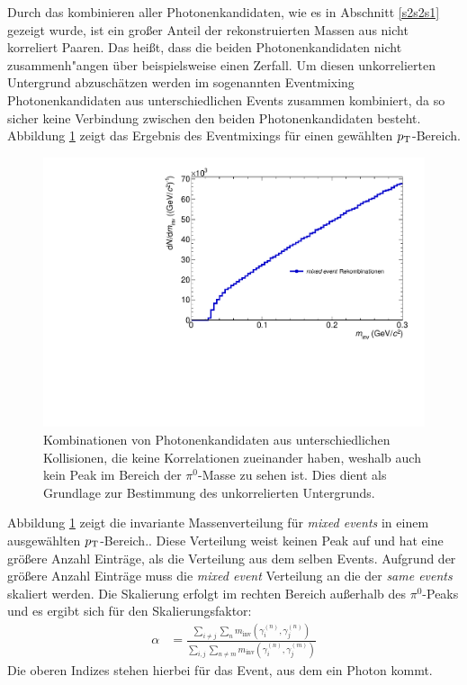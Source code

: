 Durch das kombinieren aller Photonenkandidaten, wie es in Abschnitt \ref{s2s2s1} gezeigt wurde, ist ein gro{\ss}er Anteil der rekonstruierten Massen aus nicht korreliert Paaren.
Das hei{\ss}t, dass die beiden Photonenkandidaten nicht zusammenh{"a}ngen {\"u}ber beispielsweise einen Zerfall.
Um diesen unkorrelierten Untergrund abzusch{\"a}tzen werden im sogenannten Eventmixing Photonenkandidaten aus unterschiedlichen Events zusammen kombiniert, da so sicher keine Verbindung zwischen den beiden Photonenkandidaten besteht.
Abbildung \ref{figUncorrBkg} zeigt das Ergebnis des Eventmixings f{\"u}r einen gew{\"a}hlten $p_{\rm{T}}$-Bereich.
\begin{figure}[thp]
\centering
\includegraphics[width=.6\linewidth]{hUncorrBkg.pdf}
\caption{Kombinationen von Photonenkandidaten aus unterschiedlichen Kollisionen, die keine Korrelationen zueinander haben, weshalb auch kein Peak im Bereich der $\pi^{0}$-Masse zu sehen ist. Dies dient als Grundlage zur Bestimmung des unkorrelierten Untergrunds.}
\label{figUncorrBkg}
\end{figure}
\newline
Abbildung \ref{figUncorrBkg} zeigt die invariante Massenverteilung f\"ur \textit{mixed events} in einem ausgew{\"a}hlten $p_{\rm{T}}$-Bereich..
Diese Verteilung weist keinen Peak auf und hat eine gr{\"o}{\ss}ere Anzahl Eintr{\"a}ge, als die Verteilung aus dem selben Events.
Aufgrund der gr{\"o}{\ss}ere Anzahl Eintr{\"a}ge muss die \textit{mixed event} Verteilung an die der \textit{same events} skaliert werden.
Die Skalierung erfolgt im rechten Bereich au{\ss}erhalb des $\pi^{0}$-Peaks und es ergibt sich f{\"u}r den Skalierungsfaktor:
\begin{align}
\label{eqBackSkalierung}
\alpha &= \frac{\sum_{i \neq j}\sum_{n}m_{\text{inv}}\left( \gamma^{(n)}_{i},\gamma^{(n)}_{j}\right) }{\sum_{i,j}\sum_{n \neq m}m_{\text{inv}}\left( \gamma^{(n)}_{i},\gamma^{(m)}_{j}\right) }
\end{align}
Die oberen Indizes stehen hierbei f{\"u}r das Event, aus dem ein Photon kommt.\newline
